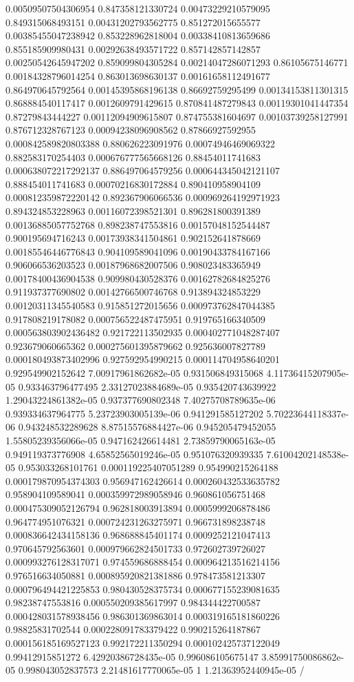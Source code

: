 \begin{table}
\begin{tabu}
\begin{sparkline}{10}
0.00509507504306954 0.847358121330724 0.00473229210579095 0.849315068493151 0.00431202793562775 0.851272015655577 0.00385455047238942 0.853228962818004 0.00338410813659686 0.855185909980431 0.00292638493571722 0.857142857142857 0.00250542645947202 0.859099804305284 0.00214047286071293 0.86105675146771 0.00184328796014254 0.863013698630137 0.00161658112491677 0.864970645792564 0.00145395868196138 0.86692759295499 0.00134153811301315 0.868884540117417 0.0012609791429615 0.870841487279843 0.00119301041447354 0.87279843444227 0.00112094909615807 0.874755381604697 0.00103739258127991 0.876712328767123 0.00094238096908562 0.87866927592955 0.000842589820803388 0.880626223091976 0.00074946469069322 0.882583170254403 0.000676777565668126 0.88454011741683 0.000638072217292137 0.886497064579256 0.000644345042121107 0.888454011741683 0.00070216830172884 0.890410958904109 0.000812359872220142 0.892367906066536 0.000969264192971923 0.894324853228963 0.00116072398521301 0.896281800391389 0.00136885057752768 0.898238747553816 0.00157048152544487 0.900195694716243 0.00173938341504861 0.902152641878669 0.00185546446776843 0.904109589041096 0.00190433784167166 0.906066536203523 0.00187968682007506 0.908023483365949 0.00178400436904538 0.909980430528376 0.00162782684825276 0.911937377690802 0.00142766500746768 0.913894324853229 0.00120311345540583 0.915851272015656 0.000973762847044385 0.917808219178082 0.000756522487475951 0.919765166340509 0.000563803902436482 0.921722113502935 0.000402771048287407 0.923679060665362 0.000275601395879662 0.925636007827789 0.000180493873402996 0.927592954990215 0.000114704958640201 0.929549902152642 7.00917961862682e-05 0.931506849315068 4.11736415207905e-05 0.933463796477495 2.33127023884689e-05 0.935420743639922 1.29043224861382e-05 0.937377690802348 7.40275708789635e-06 0.939334637964775 5.23723903005139e-06 0.941291585127202 5.70223644118337e-06 0.943248532289628 8.87515576884427e-06 0.945205479452055 1.55805239356066e-05 0.947162426614481 2.73859790065163e-05 0.949119373776908 4.65852565019246e-05 0.951076320939335 7.61004202148538e-05 0.953033268101761 0.000119225407051289 0.954990215264188 0.000179870954374303 0.956947162426614 0.000260432533635782 0.958904109589041 0.000359972989058946 0.960861056751468 0.000475309052126794 0.962818003913894 0.0005999206878486 0.964774951076321 0.000724231263275971 0.966731898238748 0.000836642434158136 0.968688845401174 0.0009252121047413 0.970645792563601 0.000979662824501733 0.972602739726027 0.000993276128317071 0.974559686888454 0.000964213516214156 0.976516634050881 0.000895920821381886 0.978473581213307 0.000796494421225853 0.980430528375734 0.000677155239081635 0.98238747553816 0.000550209385617997 0.984344422700587 0.000428031578938456 0.986301369863014 0.000319165181860226 0.98825831702544 0.000228091783379422 0.990215264187867 0.000156185169527123 0.992172211350294 0.000102425737122049 0.99412915851272 6.42920386728435e-05 0.996086105675147 3.85991750086862e-05 0.998043052837573 2.21481617770065e-05 1 1.21363952440945e-05 /

\end{sparkline}
\end{tabu}
\end{table}
